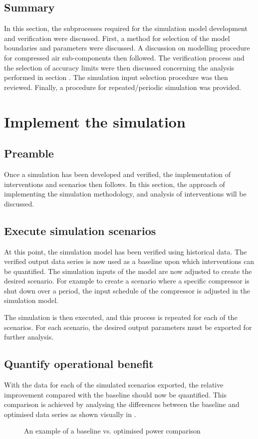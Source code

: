 	
	\subsection{Summary}	
In this section, the subprocesses required for the simulation model development and verification were discussed. First, a method for selection of the model boundaries and parameters were discussed. A discussion on modelling procedure for compressed air sub-components then followed. The verification process and the selection of accuracy limits were then discussed concerning the analysis performed in section . The simulation input selection procedure was then reviewed. Finally, a procedure for repeated/periodic simulation was provided.

\section{Implement the simulation}
	\subsection{Preamble}
		Once a simulation has been developed and verified, the implementation of interventions and scenarios then follows. In this section, the approach of implementing the simulation methodology, and analysis of interventions will be discussed.
	\subsection{Execute simulation scenarios}
		At this point, the simulation model has been verified using historical data. The verified output data series is now used as a baseline upon which interventions can be quantified.  The simulation inputs of the model are now adjusted to create the desired scenario. For example to create a scenario where a specific compressor is shut down over a period, the input schedule of the compressor is adjusted in the simulation model.
		\par
		The simulation is then executed, and this process is repeated for each of the scenarios. For each scenario, the desired output parameters must be exported for further analysis.

	\subsection{Quantify operational benefit}
		With the data for each of the simulated scenarios exported, the relative improvement compared with the baseline should now be quantified. This comparison is achieved by analysing the differences between the baseline and optimised data series as shown visually in .
		\begin{figure}[h]
			\centering
			
			\caption{An example of a baseline vs. optimised power comparison}
			\label{fig: Savings Power.}
		\end{figure} 
		
